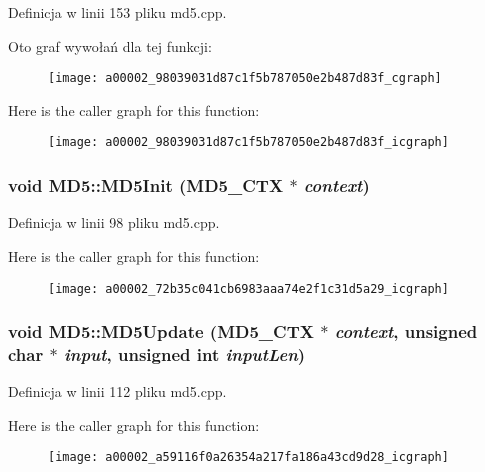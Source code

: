 Definicja w linii 153 pliku md5.cpp.

Oto graf wywołań dla tej funkcji:\nopagebreak
\begin{figure}[H]
\begin{center}
\leavevmode
\texttt{[image: a00002\_98039031d87c1f5b787050e2b487d83f\_cgraph]}
\end{center}
\end{figure}


Here is the caller graph for this function:\nopagebreak
\begin{figure}[H]
\begin{center}
\leavevmode
\texttt{[image: a00002\_98039031d87c1f5b787050e2b487d83f\_icgraph]}
\end{center}
\end{figure}
\hypertarget{a00002_72b35c041cb6983aaa74e2f1c31d5a29}{
\subsubsection[{MD5Init}]{\setlength{\rightskip}{0pt plus 5cm}void MD5::MD5Init ({\bf MD5\_\-CTX} $\ast$ {\em context})}}
\label{a00002_72b35c041cb6983aaa74e2f1c31d5a29}




Definicja w linii 98 pliku md5.cpp.

Here is the caller graph for this function:\nopagebreak
\begin{figure}[H]
\begin{center}
\leavevmode
\texttt{[image: a00002\_72b35c041cb6983aaa74e2f1c31d5a29\_icgraph]}
\end{center}
\end{figure}
\hypertarget{a00002_a59116f0a26354a217fa186a43cd9d28}{
\subsubsection[{MD5Update}]{\setlength{\rightskip}{0pt plus 5cm}void MD5::MD5Update ({\bf MD5\_\-CTX} $\ast$ {\em context}, \/  unsigned char $\ast$ {\em input}, \/  unsigned int {\em inputLen})}}
\label{a00002_a59116f0a26354a217fa186a43cd9d28}




Definicja w linii 112 pliku md5.cpp.

Here is the caller graph for this function:\nopagebreak
\begin{figure}[H]
\begin{center}
\leavevmode
\texttt{[image: a00002\_a59116f0a26354a217fa186a43cd9d28\_icgraph]}
\end{center}
\end{figure}


